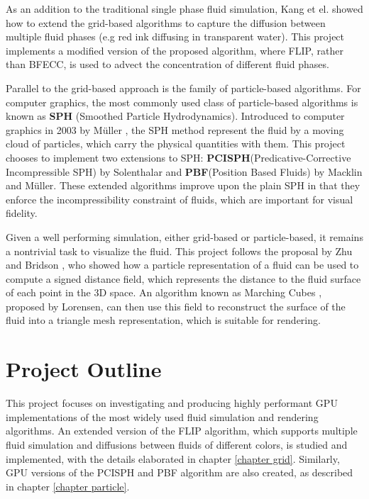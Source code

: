 As an addition to the traditional single phase fluid simulation, Kang et el.\cite{kang2010hybrid} showed how to extend the grid-based algorithms to capture the diffusion between multiple fluid phases (e.g red ink diffusing in transparent water). This project implements a modified version of the proposed algorithm, where FLIP, rather than BFECC, is used to advect the concentration of different fluid phases.

Parallel to the grid-based approach is the family of particle-based algorithms. For computer graphics, the most commonly used class of particle-based algorithms is known as \textbf{SPH} (Smoothed Particle Hydrodynamics). Introduced to computer graphics in 2003 by Müller \cite{muller2003particle}, the SPH method represent the fluid by a moving cloud of particles, which carry the physical quantities with them. This project chooses to implement two extensions to SPH:  \textbf{PCISPH}(Predicative-Corrective Incompressible SPH) by Solenthalar\cite{solenthaler2009predictive} and \textbf{PBF}(Position Based Fluids) by Macklin and Müller\cite{macklin2013position}. These extended algorithms improve upon the plain SPH in that they enforce the incompressibility constraint of fluids, which are important for visual fidelity. 

Given a well performing simulation, either grid-based or particle-based, it remains a nontrivial task to visualize the fluid. This project follows the proposal by Zhu and Bridson \cite{zhu2005animating}, who showed how a particle representation of a fluid can be used to compute a signed distance field, which represents the distance to the fluid surface of each point in the 3D space. An algorithm known as Marching Cubes \cite{lorensen1987marching}, proposed by Lorensen, can then use this field to reconstruct the surface of the fluid into a triangle mesh representation, which is suitable for rendering. 



\section{Project Outline}


This project focuses on investigating and producing highly performant GPU implementations of the most widely used fluid simulation and rendering algorithms. An extended version of the FLIP algorithm, which supports multiple fluid simulation and diffusions between fluids of different colors, is studied and implemented, with the details elaborated in chapter \ref{chapter grid}. Similarly, GPU versions of the PCISPH and PBF algorithm are also created, as described in chapter \ref{chapter particle}. 

